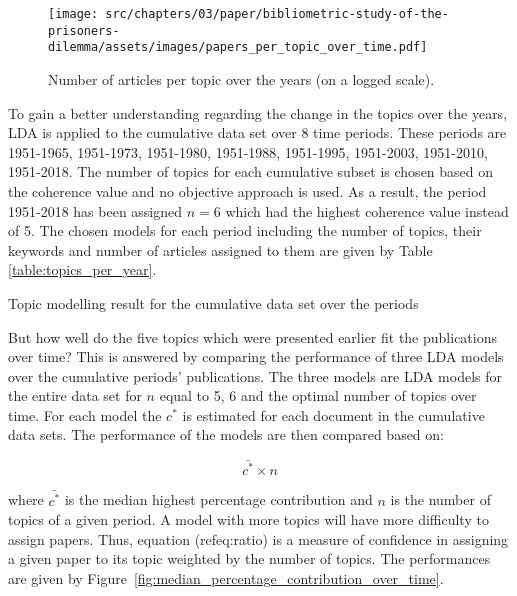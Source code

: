 \begin{figure}[!hbtp]
    \centering
    \texttt{[image: src/chapters/03/paper/bibliometric-study-of-the-prisoners-dilemma/assets/images/papers\_per\_topic\_over\_time.pdf]}
    \caption{Number of articles per topic over the years (on a logged scale).}\label{fig:number_of_articles_per_topic}
\end{figure}

To gain a better understanding regarding the change in the topics over the years,
LDA is applied to the cumulative data set over 8 time periods. These periods are
1951-1965, 1951-1973, 1951-1980, 1951-1988, 1951-1995, 1951-2003, 1951-2010,
1951-2018. The number of topics for each cumulative subset is chosen based on
the coherence value and no objective approach is used. As a result, the period
1951-2018 has been assigned \(n=6\) which had the highest coherence
value instead of 5. The chosen models for each period including the
number of topics, their keywords and number of articles assigned to them are
given by Table \ref{table:topics_per_year}.

\begin{table}[!hbtp]
    \begin{center}
    \resizebox{\textwidth}{!}{
    }
    \end{center}
    \caption{Topic modelling result for the cumulative data set over the periods
    }\label{table:topics_per_year}
\end{table}

But how well do the five topics which were presented earlier fit the
publications over time? This is answered by comparing the performance of three
LDA models over the cumulative periods' publications. The three models are LDA
models for the entire data set for \(n\) equal to 5, 6 and the optimal number of topics over time. For
each model the \(c^*\) is estimated for each document in the cumulative data
sets. The performance of the models are then compared based on:

\begin{equation}\label{eq:ratio}
    \bar{c^*} \times n
\end{equation}

where \(\bar{c^*}\) is the median highest percentage contribution and \(n\)
is the number of topics of a given period. A model with more topics will have more
difficulty to assign papers. Thus, equation (ref{eq:ratio}) is a measure of confidence
in assigning a given paper to its topic weighted by the number of topics.
The performances are
given by Figure~\ref{fig:median_percentage_contribution_over_time}.

